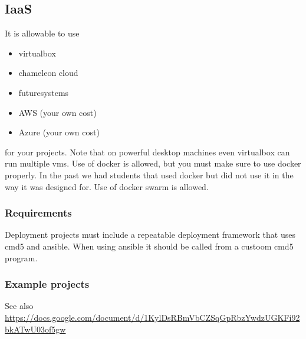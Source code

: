\subsection{IaaS}\label{iaas}

It is allowable to use

\begin{itemize}

\item
  virtualbox
\item
  chameleon cloud
\item
  futuresystems
\item
  AWS (your own cost)
\item
  Azure (your own cost)
\end{itemize}

for your projects. Note that on powerful desktop machines even
virtualbox can run multiple vms. Use of docker is allowed, but you must
make sure to use docker properly. In the past we had students that used
docker but did not use it in the way it was designed for. Use of docker
swarm is allowed.

\subsubsection{Requirements}\label{requirements}

Deployment projects must include a repeatable deployment framework that
uses cmd5 and ansible. When using ansible it should be called from a
custoom cmd5 program.

\subsubsection{Example projects}\label{example-projects}

See also
\url{https://docs.google.com/document/d/1KylDsRBmVbCZSqGpRbzYwdzUGKFi92bkATwU03of5gw}

